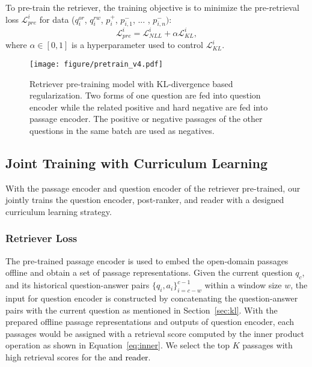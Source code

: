 To pre-train the retriever, 
the training objective is to minimize the pre-retrieval loss $\mathcal{L}^i_{pre}$ for data ($q_i^{or}$, $q_i^{rw}$, $p_i^+$, $p_{i,1}^-$, ... ,  $p_{i,n}^-)$:
\begin{equation}%
\mathcal{L}^i_{pre} = \mathcal{L}_{NLL}^i + \alpha \mathcal{L}_{KL}^i,
\end{equation}
where $\alpha \in [0, 1]$ is a hyperparameter used  to control $\mathcal{L}_{KL}^i$.
\begin{figure}[t]
    \centering
    \texttt{[image: figure/pretrain\_v4.pdf]}
    \vspace{-0.2in}
    \caption{Retriever pre-training model with KL-divergence based regularization. Two forms of one question are fed into question encoder while the related positive and hard negative are fed into passage encoder. The positive or negative passages of the other questions in the same batch are used as negatives.}
    \label{fig:kl}
    \vspace{-0.1in}
\end{figure}

\subsection{Joint Training with Curriculum Learning}
With the passage encoder and question encoder of the retriever pre-trained, our {\modelname} jointly trains the question encoder, post-ranker, and reader with a designed curriculum learning strategy.

\subsubsection{Retriever Loss}\label{subsec:retriever}
The pre-trained passage encoder is used to embed the open-domain passages offline and obtain a set of passage representations. 
Given the current question $q_c$, and its historical question-answer pairs $\{q_i, a_i\}_{i=c-w}^{c-1}$ within a window size $w$, the input for question encoder is constructed by concatenating the question-answer pairs with the current question as mentioned in Section~\ref{sec:kl}. With the prepared offline passage representations and outputs of question encoder, each passages would be assigned with a retrieval score computed by the inner product operation as shown in Equation~\ref{eq:inner}. We select the top $K$ passages with high retrieval scores for the \textcolor{black}{{\rerankname} and reader}.

